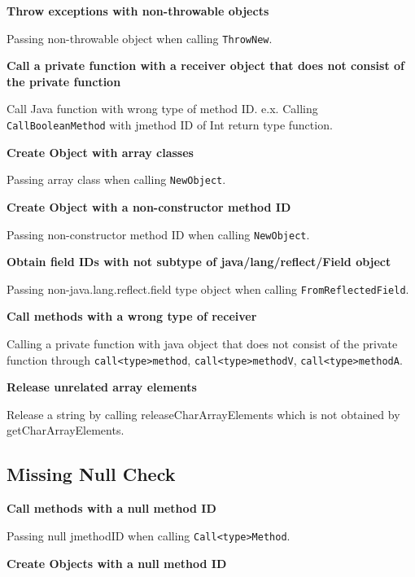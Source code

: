 \documentclass[10pt]{article}
\begin{document}
\vspace{3mm}
\noindent \textbf{Throw exceptions with non-throwable objects}

Passing non-throwable object when calling {\tt ThrowNew}.

\vspace{3mm}
\noindent \textbf{Call a private function with a receiver object that does not consist of the private function}

Call Java function with wrong type of method ID.
e.x. Calling {\tt CallBooleanMethod} with jmethod ID of Int return type function.

\vspace{3mm}
\noindent \textbf{Create Object with array classes}

Passing array class when calling {\tt NewObject}.

\vspace{3mm}
\noindent \textbf{Create Object with a non-constructor method ID}

Passing non-constructor method ID when calling {\tt NewObject}.

\vspace{3mm}
\noindent \textbf{Obtain field IDs with not subtype of java/lang/reflect/Field object}

Passing non-java.lang.reflect.field type object when calling {\tt FromReflectedField}.

\vspace{3mm}
\noindent \textbf{Call methods with a wrong type of receiver}

Calling a private function with java object that does not consist of the private function through {\tt call<type>method}, {\tt call<type>methodV}, {\tt call<type>methodA}.

\vspace{3mm}
\noindent \textbf{Release unrelated array elements}

Release a string by calling releaseCharArrayElements which is not obtained by getCharArrayElements.

\subsection{Missing Null Check}
\vspace{3mm}
\noindent \textbf{Call methods with a null method ID}

Passing null jmethodID when calling {\tt Call<type>Method}.

\vspace{3mm}
\noindent \textbf{Create Objects with a null method ID}
\end{document}
